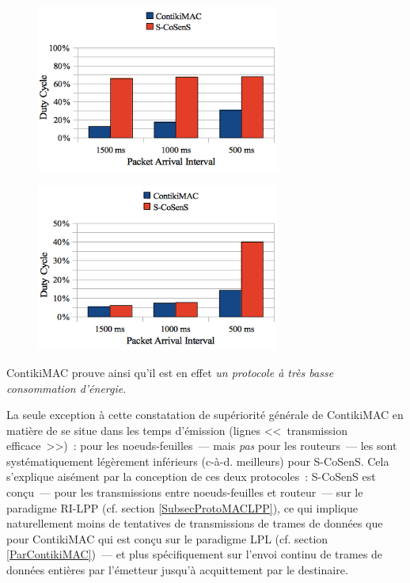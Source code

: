 \begin{figure}[htbp]
\centering
\includegraphics[width=8cm]{images/ch5-duty-cycles-routeurs.png}
\label{FigDutyCyclesRouteurs}
\end{figure}


\begin{figure}[htbp]
\centering
\includegraphics[width=8cm]{images/ch5-duty-cycles-noeuds-feuilles.png}
\label{FigDutyCyclesFeuilles}
\end{figure}


ContikiMAC prouve ainsi qu'il est en effet \emph{un protocole à très
basse consommation d'énergie}.

\bigskip

La seule exception à cette constatation de supériorité générale de
ContikiMAC en matière de  se situe dans les temps
d'émission (lignes <<~transmission efficace~>>)~: pour les
noeuds-feuilles~--- mais \emph{pas} pour les routeurs~--- les  sont systématiquement légèrement inférieurs (c-à-d. meilleurs)
pour S-CoSenS. Cela s'explique aisément par la conception de ces deux
protocoles~: S-CoSenS est conçu~--- pour les transmissions entre
noeuds-feuilles et routeur~--- sur le paradigme RI-LPP (cf. section
\vref{SubsecProtoMACLPP}), ce qui implique naturellement moins de
tentatives de transmissions de trames de données que pour ContikiMAC
qui est conçu sur le paradigme LPL (cf. section \vref{ParContikiMAC})~---
et plus spécifiquement sur l'envoi continu de trames de données entières
par l'émetteur jusqu'à acquittement par le destinaire.


